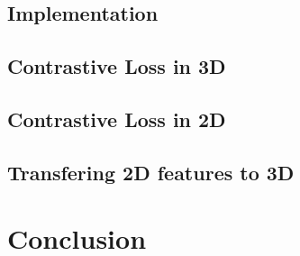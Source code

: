 \documentclass[10pt,twocolumn,letterpaper]{article}
\begin{document}
\subsection{Implementation}
\label{sec:results:implementation}

\subsection{Contrastive Loss in 3D}
\label{sec:results:3d}

\subsection{Contrastive Loss in 2D}
\label{sec:results:2d}

\subsection{Transfering 2D features to 3D}
\label{sec:results:2d3d}

\section{Conclusion}
\label{sec:conclusion}


{\small
    
    
}
\end{document}
